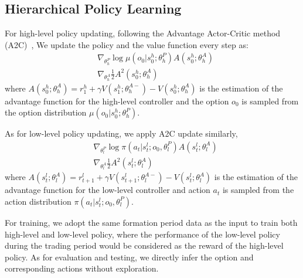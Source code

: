 \documentclass[sigconf]{acmart}
\begin{document}
\subsection{Hierarchical Policy Learning}
For high-level policy updating, following the Advantage Actor-Critic method (A2C)~\cite{mnih2016asynchronous},
We update the policy and the value function every step as:
\begin{equation}
 \begin{aligned}
 & \nabla_{\theta_h^P} \log \mu(o_0|s^h_0; \theta_h^P) A(s^h_0; \theta_h^A) \\
 & \nabla_{\theta_h^A} \frac{1}{2} A^2(s^h_0; \theta_h^A)
 \end{aligned}
 \label{train_high_level}
\end{equation}
where $A(s^h_0; \theta_h^A)=r_1^h + \gamma V(s_1^h; \theta_h^{A-}) - V(s^h_0; \theta_h^A)$ is the estimation of the advantage function for the high-level controller and the option $o_0$ 
is sampled from the option distribution $\mu(o_0|s^h_0; \theta_h^P)$.
	
As for low-level policy updating, we apply A2C update similarly,
\begin{equation}
 \begin{aligned}
 & \nabla_{\theta_l^P} \log \pi(a_t|s^l_t;o_0, \theta_l^P) A(s^l_t; \theta_l^A) \\
 & \nabla_{\theta_l^A} \frac{1}{2} A^2(s^l_t; \theta_l^A)
 \end{aligned}
 \label{train_low_level}
\end{equation}
where $A(s^l_t; \theta_l^A)=r_{t+1}^l + \gamma V(s_{t+1}^l; \theta_l^{A-}) - V(s_t^l; \theta_l^A)$ is the estimation of the advantage function for the low-level controller and action $a_t$ is sampled from the action distribution $\pi(a_t|s^l_t;o_0, \theta_l^P)$.
	
For training, we adopt the same formation period data as the input to train both high-level and low-level policy, where the performance of the low-level policy during the trading period would be considered as the reward of the high-level policy.
As for evaluation and testing, we directly infer the option and corresponding actions without exploration.
	
\end{document}
